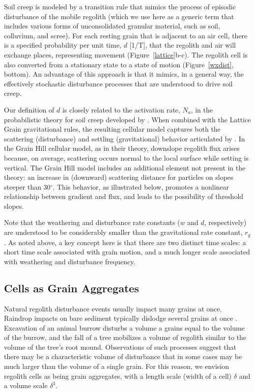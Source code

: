 \documentclass[esurf, manuscript]{copernicus}
\begin{document}
Soil creep is modeled by a transition rule that mimics the process of episodic disturbance of the mobile regolith (which we use here as a generic term that includes various forms of unconsolidated granular material, such as soil, colluvium, and scree). For each resting grain that is adjacent to an air cell, there is a specified probability per unit time, $d$ [1/T], that the regolith and air will exchange places, representing movement (Figure~\ref{lattice}b-c). The regolith cell is also converted from a stationary state to a state of motion (Figure~\ref{wxdist}, bottom). An advantage of this approach is that it mimics, in a general way, the effectively stochastic disturbance processes that are understood to drive soil creep.

Our definition of $d$ is closely related to the activation rate, $N_a$, in the probabilistic theory for soil creep developed by \citet{furbish2009statistical}. When combined with the Lattice Grain gravitational rules, the resulting cellular model captures both the scattering (disturbance) and settling (gravitational) behavior articulated by \citet{furbish2009statistical}. In the Grain Hill cellular model, as in their theory, downslope regolith flux arises because, on average, scattering occurs normal to the local surface while setting is vertical. The Grain Hill model includes an additional element not present in the \citet{furbish2009statistical} theory: an increase in (downward) scattering distance for particles on slopes steeper than 30$^\circ$. This behavior, as illustrated below, promotes a nonlinear relationship between gradient and flux, and leads to the possibility of threshold slopes.

Note that the weathering and disturbance rate constants ($w$ and $d$, respectively) are understood to be considerably smaller than the gravitational rate constant, $r_g$. As noted above, a key concept here is that there are two distinct time scales: a short time scale associated with grain motion, and a much longer scale associated with weathering and disturbance frequency.


\subsection{Cells as Grain Aggregates}

Natural regolith disturbance events usually impact many grains at once. Raindrop impacts on bare sediment typically dislodge several grains at once \citep{furbish2007rain}. Excavation of an animal burrow disturbs a volume a grains equal to the volume of the burrow, and the fall of a tree mobilizes a volume of regolith similar to the volume of the tree's root mound. Observations of such processes suggest that there may be a characteristic volume of disturbance that in some cases may be much larger than the volume of a single grain. For this reason, we envision regolith cells as being grain aggregates, with a length scale (width of a cell) $\delta$ and a volume scale $\delta^3$.
\end{document}
